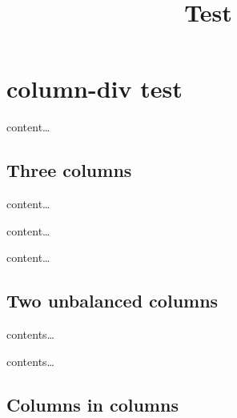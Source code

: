 \documentclass[
]{article}
\title{Test}
\author{}
\date{}
\begin{document}
\maketitle

\hypertarget{column-div-test}{%
\section{column-div test}\label{column-div-test}}

content\ldots{}

\hypertarget{three-columns}{%
\subsection{Three columns}\label{three-columns}}

\begin{multicols}{3}

content\ldots{}

content\ldots{}

content\ldots{}

\end{multicols}

\hypertarget{two-unbalanced-columns}{%
\subsection{Two unbalanced columns}\label{two-unbalanced-columns}}

\begin{minipage}[b]{0.4\columnwidth}

contents\ldots{}

\end{minipage}\begin{minipage}[b]{0.6\columnwidth}

contents\ldots{}

\end{minipage}

\hypertarget{columns-in-columns}{%
\subsection{Columns in columns}\label{columns-in-columns}}
\end{document}
